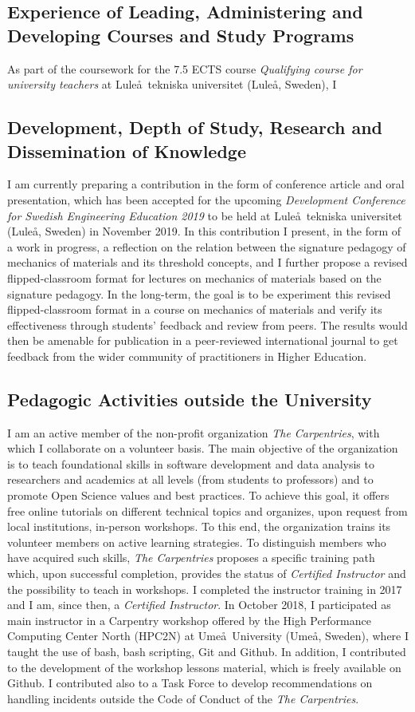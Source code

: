 \documentclass[
  a4paper, 
]{fortysecondscv}
\begin{document}
\subsection{Experience of Leading, Administering and Developing Courses and Study Programs}
As part of the coursework for the 7.5 ECTS course \emph{Qualifying course for university teachers} at Lule\aa\ tekniska universitet (Lule\aa, Sweden), I 

\subsection{Development, Depth of Study, Research and Dissemination of Knowledge}
I am currently preparing a contribution in the form of conference article and oral presentation, which has been accepted for the upcoming \textit{Development Conference for Swedish Engineering Education 2019} to be held at Lule\aa\ tekniska universitet (Lule\aa, Sweden) in November 2019. In this contribution I present, in the form of a work in progress, a reflection on the relation between the signature pedagogy of mechanics of materials and its threshold concepts, and I further propose a revised flipped-classroom format for lectures on mechanics of materials based on the signature pedagogy. In the long-term, the goal is to be experiment this revised flipped-classroom format in a course on mechanics of materials and verify its effectiveness through students' feedback and review from peers. The results would then be amenable for publication in a peer-reviewed international journal to get feedback from the wider community of practitioners in Higher Education.

\subsection{Pedagogic Activities outside the University}
I am an active member of the non-profit organization \emph{The Carpentries}, with which I collaborate on a volunteer basis. The main objective of the organization is to teach foundational skills in software development and data analysis to researchers and academics at all levels (from students to professors) and to promote Open Science values and best practices. To achieve this goal, it offers free online tutorials on different technical topics and organizes, upon request from local institutions, in-person workshops. To this end, the organization trains its volunteer members on active learning strategies. To distinguish members who have acquired such skills, \emph{The Carpentries} proposes a specific training path which, upon successful completion, provides the status of \emph{Certified Instructor} and the possibility to teach in workshops. I completed the instructor training in 2017 and I am, since then, a \emph{Certified Instructor}. In October 2018, I participated as main instructor in a Carpentry workshop offered by the High Performance Computing Center North (HPC2N) at Ume\aa\ University (Ume\aa, Sweden), where I taught the use of bash, bash scripting, Git and Github. In addition, I contributed to the development of the workshop lessons material, which is freely available on Github. I contributed also to a Task Force to develop recommendations on handling incidents outside the Code of Conduct of the \emph{The Carpentries}.
\end{document}
